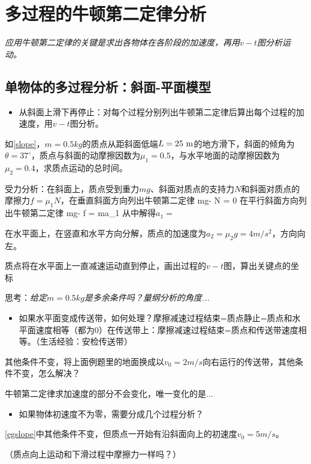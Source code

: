 \documentclass[a4paper,9pt]{ctexart}
\begin{document}
\newpage
\section{多过程的牛顿第二定律分析}
\emph{应用牛顿第二定律的关键是求出各物体在各阶段的加速度，再用$v-t$图分析运动。}
\subsection{单物体的多过程分析：斜面-平面模型}
\begin{itemize}
\item
从斜面上滑下再停止：对每个过程分别列出牛顿第二定律后算出每个过程的加速度，用$v-t$图分析。
\end{itemize}
\begin{eg} \label{egslope}
如\cref{slope}，$m=0.5\unit{kg}$的质点从距斜面低端$L = 25{\rm \ m}$的地方滑下，斜面的倾角为$\theta = 37^\circ$，质点与斜面的动摩擦因数为$\mu_1 = 0.5$，与水平地面的动摩擦因数为$\mu_2 = 0.4$，求质点运动的总时间。
\end{eg}
\begin{ans}
受力分析：在斜面上，质点受到重力$mg$、斜面对质点的支持力$N$和斜面对质点的摩擦力$f = \mu_1 N$，在垂直斜面方向列出牛顿第二定律
\beq
mg\cos \theta - N = 0
\eeq
在平行斜面方向列出牛顿第二定律
\beq
mg\sin \theta - f = ma_1
\eeq
从中解得$a_1 =$
\par
在水平面上，在竖直和水平方向分解，质点的加速度为$a_2 = \mu_2 g = 4\unit{m/s^2}$，方向向左。
\par
质点将在水平面上一直减速运动直到停止，画出过程的$v-t$图，算出关键点的坐标
\vspace{6cm}
\end{ans}
思考：\emph{给定$m = 0.5\unit{kg}$是多余条件吗？量纲分析的角度...}
\begin{itemize}
\item
如果水平面变成传送带，如何处理？摩擦减速过程结束=质点静止=质点和水平面速度相等（都为0）\so 在传送带上：摩擦减速过程结束=质点和传送带速度相等。（生活经验：安检传送带）
\end{itemize}
\begin{eg}
其他条件不变，将上面例题里的地面换成以$v_0 = 2\unit{m/s}$向右运行的传送带，其他条件不变，怎么解决？
\end{eg}
\begin{ans}
牛顿第二定律求加速度的部分不会变化，唯一变化的是...
\vspace{6cm}
\end{ans}
\begin{itemize}
\item
如果物体初速度不为零，需要分成几个过程分析？
\end{itemize}
\begin{eg}
\cref{egslope}中其他条件不变，但质点一开始有沿斜面向上的初速度$v_0 = 5\unit{m/s}$。
\end{eg}
\begin{ans}
（质点向上运动和下滑过程中摩擦力一样吗？）
\vspace{8cm}
\end{ans}
\end{document}
